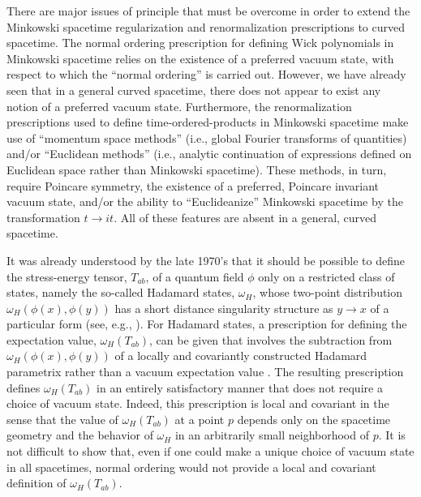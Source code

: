\documentclass[12pt,epsf,amsfonts,amssymb]{article}
\begin{document}
There are major issues of principle that must be overcome in order to
extend the Minkowski spacetime regularization and renormalization
prescriptions to curved spacetime. The normal ordering prescription
for defining Wick polynomials in Minkowski spacetime relies on the
existence of a preferred vacuum state, with respect to which the
``normal ordering'' is carried out. However, we have already seen that
in a general curved spacetime, there does not appear to exist any
notion of a preferred vacuum state. Furthermore, the renormalization
prescriptions used to define time-ordered-products in Minkowski
spacetime make use of ``momentum space methods'' (i.e., global Fourier
transforms of quantities) and/or ``Euclidean methods'' (i.e., analytic
continuation of expressions defined on Euclidean space rather than
Minkowski spacetime). These methods, in turn, require Poincare
symmetry, the existence of a preferred, Poincare invariant vacuum
state, and/or the ability to ``Euclideanize'' Minkowski spacetime by
the transformation $t \rightarrow it$. All of these features are
absent in a general, curved spacetime.

It was already understood by the late 1970's that it should be
possible to define the stress-energy tensor, $T_{ab}$, of a quantum
field $\phi$ only on a restricted class of states, namely the
so-called Hadamard states, $\omega_H$, whose two-point distribution
$\omega_H (\phi(x), \phi(y))$ has a short distance singularity
structure as $y \rightarrow x$ of a particular form (see, e.g.,
\cite{w2}). For Hadamard states, a prescription for defining the
expectation value, $\omega_H (T_{ab})$, can be given that involves the
subtraction from $\omega_H (\phi(x), \phi(y))$ of a locally and
covariantly constructed Hadamard parametrix rather than a vacuum
expectation value \cite{w2}. The resulting prescription defines $\omega_H
(T_{ab})$ in an entirely satisfactory manner that does not require a
choice of vacuum state. Indeed, this prescription is local and
covariant in the sense that the value of $\omega_H (T_{ab})$ at a
point $p$ depends only on the spacetime geometry and the behavior of
$\omega_H$ in an arbitrarily small neighborhood of $p$. It is not
difficult to show that, even if one could make a unique choice of
vacuum state in all spacetimes, normal ordering would not provide a local
and covariant definition of $\omega_H (T_{ab})$.
\end{document}
